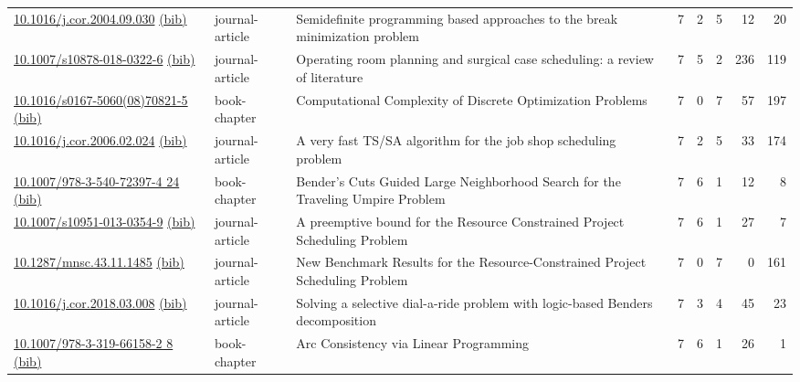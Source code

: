 {\begin{longtable}{p{5cm}lp{11cm}rrrrr}
\href{http://dx.doi.org/10.1016/j.cor.2004.09.030}{10.1016/j.cor.2004.09.030} \href{https://www.doi2bib.org/bib/10.1016/j.cor.2004.09.030}{(bib)} & journal-article & Semidefinite programming based approaches to the break minimization problem & 7 & 2 & 5 & 12 & 20 \\
\href{http://dx.doi.org/10.1007/s10878-018-0322-6}{10.1007/s10878-018-0322-6} \href{https://www.doi2bib.org/bib/10.1007/s10878-018-0322-6}{(bib)} & journal-article & Operating room planning and surgical case scheduling: a review of literature & 7 & 5 & 2 & 236 & 119 \\
\href{http://dx.doi.org/10.1016/s0167-5060(08)70821-5}{10.1016/s0167-5060(08)70821-5} \href{https://www.doi2bib.org/bib/10.1016/s0167-5060(08)70821-5}{(bib)} & book-chapter & Computational Complexity of Discrete Optimization Problems & 7 & 0 & 7 & 57 & 197 \\
\href{http://dx.doi.org/10.1016/j.cor.2006.02.024}{10.1016/j.cor.2006.02.024} \href{https://www.doi2bib.org/bib/10.1016/j.cor.2006.02.024}{(bib)} & journal-article & A very fast TS/SA algorithm for the job shop scheduling problem & 7 & 2 & 5 & 33 & 174 \\
\href{http://dx.doi.org/10.1007/978-3-540-72397-4_24}{10.1007/978-3-540-72397-4 24} \href{https://www.doi2bib.org/bib/10.1007/978-3-540-72397-4_24}{(bib)} & book-chapter & Bender's Cuts Guided Large Neighborhood Search for the Traveling Umpire Problem & 7 & 6 & 1 & 12 & 8 \\
\href{http://dx.doi.org/10.1007/s10951-013-0354-9}{10.1007/s10951-013-0354-9} \href{https://www.doi2bib.org/bib/10.1007/s10951-013-0354-9}{(bib)} & journal-article & A preemptive bound for the Resource Constrained Project Scheduling Problem & 7 & 6 & 1 & 27 & 7 \\
\href{http://dx.doi.org/10.1287/mnsc.43.11.1485}{10.1287/mnsc.43.11.1485} \href{https://www.doi2bib.org/bib/10.1287/mnsc.43.11.1485}{(bib)} & journal-article & New Benchmark Results for the Resource-Constrained Project Scheduling Problem & 7 & 0 & 7 & 0 & 161 \\
\href{http://dx.doi.org/10.1016/j.cor.2018.03.008}{10.1016/j.cor.2018.03.008} \href{https://www.doi2bib.org/bib/10.1016/j.cor.2018.03.008}{(bib)} & journal-article & Solving a selective dial-a-ride problem with logic-based Benders decomposition & 7 & 3 & 4 & 45 & 23 \\
\href{http://dx.doi.org/10.1007/978-3-319-66158-2_8}{10.1007/978-3-319-66158-2 8} \href{https://www.doi2bib.org/bib/10.1007/978-3-319-66158-2_8}{(bib)} & book-chapter & Arc Consistency via Linear Programming & 7 & 6 & 1 & 26 & 1 \\

\end{longtable}}
